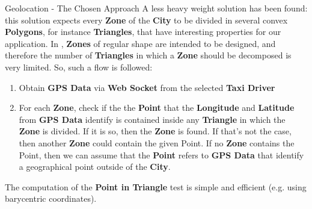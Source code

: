 \documentclass{../common/latex_classes/pdf_presentation}
\begin{document}
	\begin{frame}{Geolocation - The Chosen Approach}
		A less heavy weight solution has been found: this solution expects every \textbf{Zone} of the \textbf{City} to be divided in several convex \textbf{Polygons}, for instance \textbf{Triangles}, that have interesting properties for our application.
		In \myTaxiService{}, \textbf{Zones} of regular shape are intended to be designed, and therefore the number of \textbf{Triangles} in which a \textbf{Zone} should be decomposed is very limited.
		So, such a flow is followed:
		\begin{enumerate}
			\item Obtain \textbf{GPS Data} via \textbf{Web Socket} from the selected \textbf{Taxi Driver}
			\item For each \textbf{Zone}, check if the the \textbf{Point} that the \textbf{Longitude} and \textbf{Latitude} from \textbf{GPS Data} identify is contained inside any \textbf{Triangle} in which the \textbf{Zone} is divided. If it is so, then the \textbf{Zone} is found. If that's not the case, then another \textbf{Zone} could contain the given Point. If no \textbf{Zone} contains the Point, then we can assume that the \textbf{Point} refers to \textbf{GPS Data} that identify a geographical point outside of the \textbf{City}.
		\end{enumerate}
		The computation of the \textbf{Point in Triangle} test is simple and efficient (e.g. using barycentric coordinates).
	\end{frame}
\end{document}
